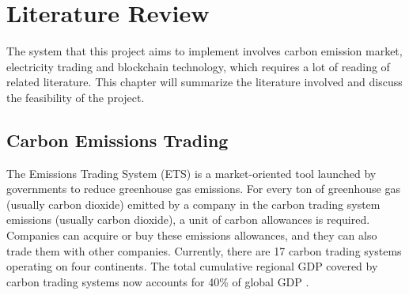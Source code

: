 \chapter{Literature Review} \label{chapter:literature}
The system that this project aims to implement involves carbon emission market, electricity trading and blockchain technology, which requires a lot of reading of related literature. This chapter will summarize the literature involved and discuss the feasibility of the project.
\section{Carbon Emissions Trading}
The Emissions Trading System (ETS) is a market-oriented tool launched by governments to reduce greenhouse gas emissions\cite{Han580003}. For every ton of greenhouse gas (usually carbon dioxide) emitted by a company in the carbon trading system emissions (usually carbon dioxide), a unit of carbon allowances is required. Companies can acquire or buy these emissions allowances, and they can also trade them with other companies. Currently, there are 17 carbon trading systems operating on four continents. The total cumulative regional GDP covered by carbon trading systems now accounts for 40\% of global GDP \cite{ZHAO20161229}.
